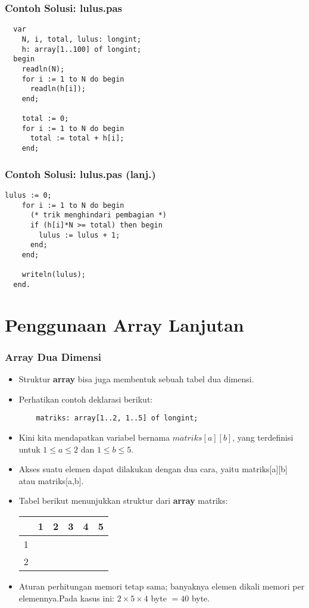 \begin{frame}[fragile]
\frametitle{Contoh Solusi: lulus.pas}
\begin{lstlisting}
  var
    N, i, total, lulus: longint;
    h: array[1..100] of longint;
  begin
    readln(N);
    for i := 1 to N do begin
      readln(h[i]);
    end;

    total := 0;
    for i := 1 to N do begin
      total := total + h[i];
    end;
\end{lstlisting}
\end{frame}

\begin{frame}[fragile]
\frametitle{Contoh Solusi: lulus.pas (lanj.)}
\begin{lstlisting}[gobble=2]
    lulus := 0;
    for i := 1 to N do begin
      (* trik menghindari pembagian *)
      if (h[i]*N >= total) then begin
        lulus := lulus + 1;
      end;
    end;

    writeln(lulus);
  end.
\end{lstlisting}
\end{frame}

\section{Penggunaan Array Lanjutan}
\frame{\sectionpage}

\begin{frame}[fragile]
\frametitle{Array Dua Dimensi}
\begin{itemize}
  \item Struktur \textbf{array} bisa juga membentuk sebuah tabel dua dimensi.
  \item Perhatikan contoh deklarasi berikut:
  \begin{lstlisting}
    matriks: array[1..2, 1..5] of longint;
  \end{lstlisting}
  \item Kini kita mendapatkan variabel bernama $matriks[a][b]$, yang terdefinisi untuk $1 \le a \le 2$ dan $1 \le b \le 5$.
  \item Akses suatu elemen dapat dilakukan dengan dua cara, yaitu matriks[a][b] atau matriks[a,b].
  \item Tabel berikut menunjukkan struktur dari \textbf{array} matriks:
  \begin{table}[h]
    \begin{tabular}{c|c|c|c|c|c|}
        & 1 & 2 & 3 & 4 & 5\\
      \hline 1 & & & & & \\
      \hline 2 & & & & & \\
      \hline
    \end{tabular}
  \end{table}
  \item Aturan perhitungan memori tetap sama; banyaknya elemen dikali memori per elemennya.\newline Pada kasus ini: $2 \times 5 \times 4$ byte $= 40$ byte.
\end{itemize}
\end{frame}

